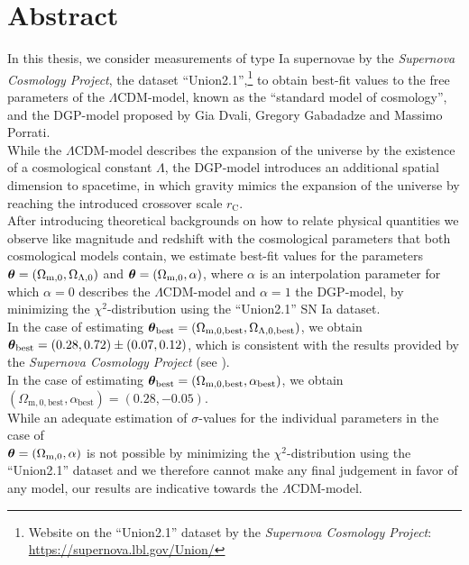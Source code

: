 \chapter*{Abstract}
\thispagestyle{empty}

\noindent In this thesis, we consider measurements of type Ia supernovae by the \textit{Supernova Cosmology Project}, the dataset ``Union2.1'',\footnote{Website on the ``Union2.1'' dataset by the \textit{Supernova Cosmology Project}: \href{https://supernova.lbl.gov/Union/}{https://supernova.lbl.gov/Union/}}  to obtain best-fit values to the free parameters of the $\Lambda$CDM-model, known as the ``standard model of cosmology'', and the DGP-model proposed by Gia Dvali, Gregory Gabadadze and Massimo Porrati. \\
While the $\Lambda$CDM-model describes the expansion of the universe by the existence of a cosmological constant $\Lambda$, the DGP-model introduces an additional spatial dimension to spacetime, in which gravity mimics the expansion of the universe by reaching the introduced crossover scale $r_{\text{C}}$. \\
After introducing theoretical backgrounds on how to relate physical quantities we observe like magnitude and redshift with the cosmological parameters that both cosmological models contain, we estimate best-fit values for the parameters $\vb*{\theta} = (\Omega_{\text{m},0}, \Omega_{\Lambda,0})$ and $\vb*{\theta} = (\Omega_{\text{m},0}, \alpha)$, where $\alpha$ is an interpolation parameter for which $\alpha = 0$ describes the $\Lambda$CDM-model and $\alpha = 1$ the DGP-model, by minimizing the $\chi^2$-distribution using the ``Union2.1'' SN Ia dataset. \\

\noindent In the case of estimating $\vb*{\theta}_{\text{best}} = (\Omega_{\text{m}, 0, \text{best}}, \Omega_{\Lambda, 0, \text{best}})$, we obtain $\vb*{\theta}_{\text{best}} = (0.28, 0.72) \pm (0.07, 0.12)$, which is consistent with the results provided by the \textit{Supernova Cosmology Project} (see \cite{Suzuki2012}). \\
In the case of estimating $\vb*{\theta}_{\text{best}} = (\Omega_{\text{m}, 0, \text{best}}, \alpha_{\text{best}})$, we obtain $(\Omega_{\text{m}, 0, \text{best}}, \alpha_{\text{best}}) = (0.28, -0.05)$. \\

\noindent While an adequate estimation of $\sigma$-values for the individual parameters in the case of \\
${\vb*{\theta} = (\Omega_{\text{m},0}, \alpha)}$ is not possible by minimizing the $\chi^2$-distribution using the ``Union2.1'' dataset and we therefore cannot make any final judgement in favor of any model, our results are indicative towards the $\Lambda$CDM-model.

